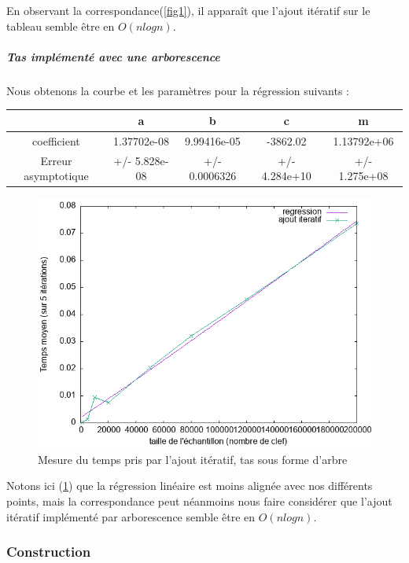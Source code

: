 \documentclass[12pt,a4paper]{article}
\begin{document}
En observant la correspondance(\ref{fig1}), il apparaît que l'ajout itératif sur le tableau semble être en $O(n log n)$.


\subparagraph{Tas implémenté avec une arborescence}

Nous obtenons la courbe et les paramètres pour la régression suivants : 


\begin{center}
\begin{tabular}{|c|c|c|c|c|}
\hline
 & a & b & c & m\\
\hline
coefficient & 1.37702e-08 & 
9.99416e-05 & 
-3862.02 & 
1.13792e+06 \\
Erreur asymptotique & +/- 5.828e-08 & +/- 0.0006326 & +/- 4.284e+10   & +/- 1.275e+08\\
\hline
\end{tabular}
\end{center}


\begin{figure}[hbtp]
\centering
\includegraphics[scale=0.4]{../Images/svg courbes pour rapport/regression_ajout_iteratif_arbre.png}
\caption{Mesure du temps pris par l'ajout itératif, tas sous forme d'arbre}
\label{fig2}
\end{figure}

Notons ici (\ref{fig2}) que la régression linéaire est moins alignée avec nos différents points, mais la correspondance peut néanmoins nous faire considérer que l'ajout itératif implémenté par arborescence semble être en $O(n log n)$.




\subsubsection{Construction}
\end{document}
